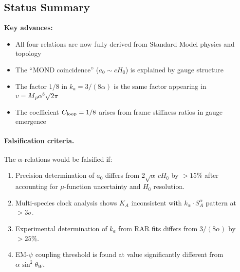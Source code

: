 \subsection{Status Summary}\label{sec:alpha-status}

\begin{table}[h]
\centering
\caption{Status of $\alpha$-relation derivations.}\label{tab:alpha-status}
\end{table}

\textbf{Key advances:}
\begin{itemize}
\item All four relations are now fully derived from Standard Model physics and topology
\item The ``MOND coincidence'' ($a_0 \sim cH_0$) is explained by gauge structure
\item The factor $1/8$ in $k_a = 3/(8\alpha)$ is the same factor appearing in $v = M_P \alpha^8 \sqrt{2\pi}$
\item The coefficient $C_{\rm loop} = 1/8$ arises from frame stiffness ratios in gauge emergence
\end{itemize}

\paragraph{Falsification criteria.}
The $\alpha$-relations would be falsified if:
\begin{enumerate}
\item Precision determination of $a_0$ differs from $2\sqrt{\alpha}\,cH_0$ by $>15\%$ after accounting for $\mu$-function uncertainty and $H_0$ resolution.
\item Multi-species clock analysis shows $K_A$ inconsistent with $k_\alpha \cdot S_A^\alpha$ pattern at $>3\sigma$.
\item Experimental determination of $k_a$ from RAR fits differs from $3/(8\alpha)$ by $>25\%$.
\item EM-$\psi$ coupling threshold is found at value significantly different from $\alpha \sin^2\theta_W$.
\end{enumerate}

